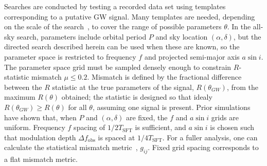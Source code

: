 Searches are conducted by testing a recorded data set using templates corresponding to a putative GW signal.
Many templates are needed, depending on the scale of the search~\cite{GoetzTwoSpectMethods2011}, to cover the range of possible parameters $\theta$.
In the all-sky search, parameters include orbital period $P$ and sky location $(\alpha, \delta)$, but the directed search described herein can be used when these are known, so the parameter space is restricted to frequency $f$ and projected semi-major axis $a \sin i$.
The parameter space grid must be sampled densely enough to constrain $R$-statistic mismatch $\mu \leq 0.2$.
Mismatch is defined by the fractional difference between the $R$ statistic at the true parameters of the signal, $R(\theta_{GW})$, from the maximum $R(\theta)$ obtained; the statistic is designed so that idealy $R(\theta_{GW}) \geq R(\theta)$ for all $\theta$, assuming one signal is present.
Prior simulations have shown that, when $P$ and $(\alpha,\delta)$ are fixed, the $f$ and $a \sin i$ grids are uniform.
Frequency $f$ spacing of $1/2T_\mathrm{SFT}$ is sufficient, and $a \sin i$ is chosen such that modulation depth $\Delta f_\mathrm{obs}$ is spaced at $1/4T_\mathrm{SFT}$.
For a fuller analysis, one can calculate the statistical mismatch metric~\cite{Brady1998}, $g_{ij}$.
Fixed grid spacing corresponds to a flat mismatch metric.
